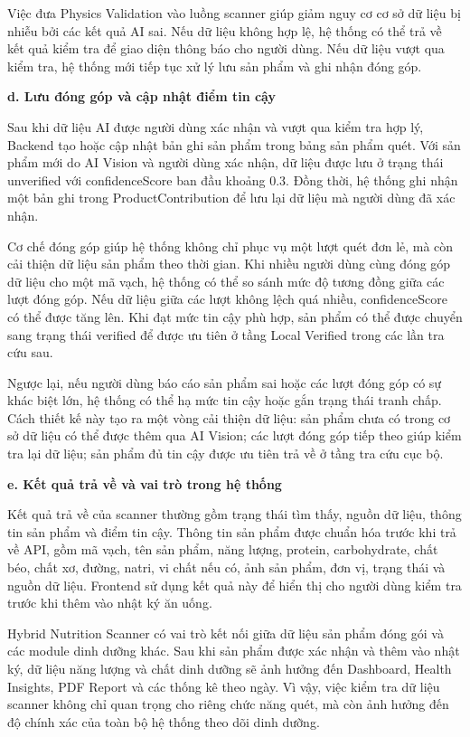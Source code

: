 Việc đưa Physics Validation vào luồng scanner giúp giảm nguy cơ cơ sở dữ liệu bị nhiễu bởi các kết quả AI sai. Nếu dữ liệu không hợp lệ, hệ thống có thể trả về kết quả kiểm tra để giao diện thông báo cho người dùng. Nếu dữ liệu vượt qua kiểm tra, hệ thống mới tiếp tục xử lý lưu sản phẩm và ghi nhận đóng góp.

\textbf{d. Lưu đóng góp và cập nhật điểm tin cậy}

Sau khi dữ liệu AI được người dùng xác nhận và vượt qua kiểm tra hợp lý, Backend tạo hoặc cập nhật bản ghi sản phẩm trong bảng sản phẩm quét. Với sản phẩm mới do AI Vision và người dùng xác nhận, dữ liệu được lưu ở trạng thái unverified với confidenceScore ban đầu khoảng 0.3. Đồng thời, hệ thống ghi nhận một bản ghi trong ProductContribution để lưu lại dữ liệu mà người dùng đã xác nhận.

Cơ chế đóng góp giúp hệ thống không chỉ phục vụ một lượt quét đơn lẻ, mà còn cải thiện dữ liệu sản phẩm theo thời gian. Khi nhiều người dùng cùng đóng góp dữ liệu cho một mã vạch, hệ thống có thể so sánh mức độ tương đồng giữa các lượt đóng góp. Nếu dữ liệu giữa các lượt không lệch quá nhiều, confidenceScore có thể được tăng lên. Khi đạt mức tin cậy phù hợp, sản phẩm có thể được chuyển sang trạng thái verified để được ưu tiên ở tầng Local Verified trong các lần tra cứu sau.

Ngược lại, nếu người dùng báo cáo sản phẩm sai hoặc các lượt đóng góp có sự khác biệt lớn, hệ thống có thể hạ mức tin cậy hoặc gắn trạng thái tranh chấp. Cách thiết kế này tạo ra một vòng cải thiện dữ liệu: sản phẩm chưa có trong cơ sở dữ liệu có thể được thêm qua AI Vision; các lượt đóng góp tiếp theo giúp kiểm tra lại dữ liệu; sản phẩm đủ tin cậy được ưu tiên trả về ở tầng tra cứu cục bộ.

\textbf{e. Kết quả trả về và vai trò trong hệ thống}

Kết quả trả về của scanner thường gồm trạng thái tìm thấy, nguồn dữ liệu, thông tin sản phẩm và điểm tin cậy. Thông tin sản phẩm được chuẩn hóa trước khi trả về API, gồm mã vạch, tên sản phẩm, năng lượng, protein, carbohydrate, chất béo, chất xơ, đường, natri, vi chất nếu có, ảnh sản phẩm, đơn vị, trạng thái và nguồn dữ liệu. Frontend sử dụng kết quả này để hiển thị cho người dùng kiểm tra trước khi thêm vào nhật ký ăn uống.

Hybrid Nutrition Scanner có vai trò kết nối giữa dữ liệu sản phẩm đóng gói và các module dinh dưỡng khác. Sau khi sản phẩm được xác nhận và thêm vào nhật ký, dữ liệu năng lượng và chất dinh dưỡng sẽ ảnh hưởng đến Dashboard, Health Insights, PDF Report và các thống kê theo ngày. Vì vậy, việc kiểm tra dữ liệu scanner không chỉ quan trọng cho riêng chức năng quét, mà còn ảnh hưởng đến độ chính xác của toàn bộ hệ thống theo dõi dinh dưỡng.

